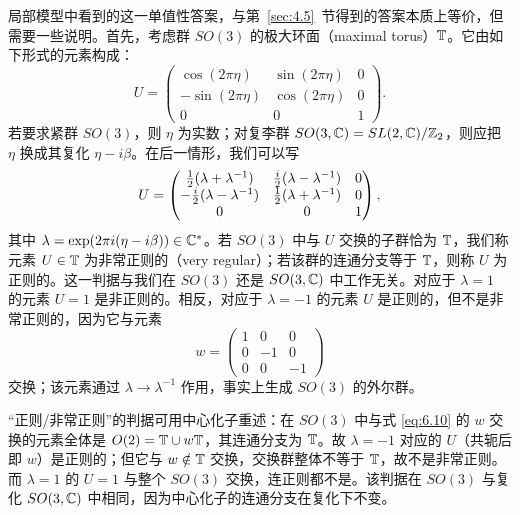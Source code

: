 局部模型中看到的这一单值性答案，与第~\ref{sec:4.5}~节得到的答案本质上等价，但需要一些说明。首先，考虑群 $SO(3)$ 的极大环面（maximal torus）${\mathbb{T}}$。它由如下形式的元素构成：
\setcounter{equation}{7}
\begin{equation}\label{eq:6.8}
  U=\left(\begin{matrix}\cos(2\pi\eta)&\sin(2\pi\eta)&0\\ -\sin(2\pi\eta)&
\cos(2\pi\eta)&0\\ 0&0&1\end{matrix}\right).
\end{equation}
若要求紧群 $SO(3)$，则 $\eta$ 为实数；对复李群 $SO(3,{\mathbb{C}})=SL(2,{\mathbb{C}})/{\mathbb{Z}}_2$，则应把 $\eta$ 换成其复化 $\eta-i\beta$。在后一情形，我们可以写
\setcounter{equation}{8}
\begin{equation}\label{eq:6.9}
  U=\left(\begin{matrix}{1\over 2}(\lambda+\lambda^{-1})&{i\over 2}(\lambda-\lambda^{-1})
&0\\ -{i\over 2}(\lambda-\lambda^{-1})&{1\over 2}(\lambda+\lambda^{-1})&0\\ 0&0&1\end{matrix}\right),
\end{equation}
其中 $\lambda=\exp(2\pi i(\eta-i\beta))\in {\mathbb{C}}^*$。若 $SO(3)$ 中与 $U$ 交换的子群恰为 ${\mathbb{T}}$，我们称元素 $U\in{\mathbb{T}}$ 为非常正则的（very regular）；若该群的连通分支等于 ${\mathbb{T}}$，则称 $U$ 为正则的。这一判据与我们在 $SO(3)$ 还是 $SO(3,{\mathbb{C}})$ 中工作无关。对应于 $\lambda=1$ 的元素 $U=1$ 是非正则的。相反，对应于 $\lambda=-1$ 的元素 $U$ 是正则的，但不是非常正则的，因为它与元素
\setcounter{equation}{9}
\begin{equation}\label{eq:6.10}
  w=\left(\begin{matrix}1&0&0\\ 0&-1&0\\ 0&0&-1\end{matrix}\right)
\end{equation}
交换；该元素通过 $\lambda\to \lambda^{-1}$ 作用，事实上生成 $SO(3)$ 的外尔群。

\begin{yizhu}[含糊点拨]“正则/非常正则”的判据可用中心化子重述：在 $SO(3)$ 中与式 \eqref{eq:6.10} 的 $w$ 交换的元素全体是 $O(2)={\mathbb{T}}\cup w{\mathbb{T}}$，其连通分支为 ${\mathbb{T}}$。故 $\lambda=-1$ 对应的 $U$（共轭后即 $w$）是正则的；但它与 $w\notin{\mathbb{T}}$ 交换，交换群整体不等于 ${\mathbb{T}}$，故不是非常正则。而 $\lambda=1$ 的 $U=1$ 与整个 $SO(3)$ 交换，连正则都不是。该判据在 $SO(3)$ 与复化 $SO(3,{\mathbb{C}})$ 中相同，因为中心化子的连通分支在复化下不变。\end{yizhu}


